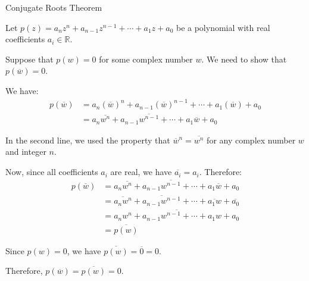 \documentclass[a4paper, 10pt]{article}
\begin{document}
\begin{proofbox}{Conjugate Roots Theorem}

  Let $p(z) = a_nz^n + a_{n-1}z^{n-1} + \cdots + a_1z + a_0$ be a polynomial with real coefficients $a_i \in \mathbb{R}$.

  Suppose that $p(w) = 0$ for some complex number $w$. We need to show that $p(\overline{w}) = 0$.

  We have:
  \begin{align}
    p(\overline{w}) & = a_n(\overline{w})^n + a_{n-1}(\overline{w})^{n-1} + \cdots + a_1(\overline{w}) + a_0 \\
                    & = a_n\overline{w^n} + a_{n-1}\overline{w^{n-1}} + \cdots + a_1\overline{w} + a_0
  \end{align}

  In the second line, we used the property that $\overline{w}^n = \overline{w^n}$ for any complex number $w$ and integer $n$.

  Now, since all coefficients $a_i$ are real, we have $\overline{a_i} = a_i$. Therefore:
  \begin{align}
    p(\overline{w}) & = a_n\overline{w^n} + a_{n-1}\overline{w^{n-1}} + \cdots + a_1\overline{w} + a_0            \\
                    & = \overline{a_nw^n} + \overline{a_{n-1}w^{n-1}} + \cdots + \overline{a_1w} + \overline{a_0} \\
                    & = \overline{a_nw^n + a_{n-1}w^{n-1} + \cdots + a_1w + a_0}                                  \\
                    & = \overline{p(w)}
  \end{align}

  Since $p(w) = 0$, we have $\overline{p(w)} = \overline{0} = 0$.

  Therefore, $p(\overline{w}) = \overline{p(w)} = 0$.

\end{proofbox}
\end{document}
